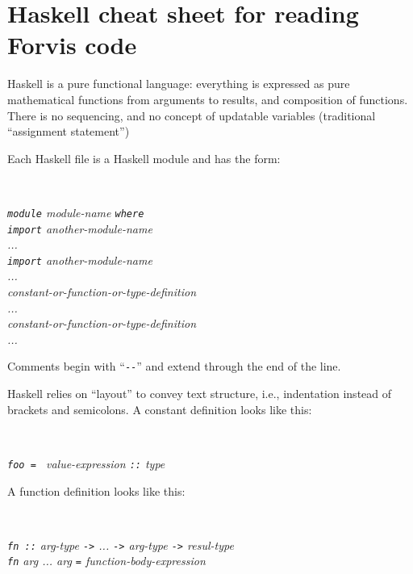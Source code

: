 \documentclass[11pt]{article}
\newcommand{\hmmmm}{\hspace*{4em}}
\begin{document}





\newpage

\appendix

\section{Haskell cheat sheet for reading Forvis code}

\label{sec_haskell_cheat_sheet}

Haskell is a pure functional language: everything is expressed as pure
mathematical functions from arguments to results, and composition of
functions.  There is no sequencing, and no concept of updatable
variables (traditional ``assignment statement'')

Each Haskell file is a Haskell module and has the form:

\hmmmm \
\begin{minipage}[t]{4in}\it
{\tt module} module-name {\tt where} \\
{\tt import} another-module-name \\
... \\
{\tt import} another-module-name \\
... \\
constant-or-function-or-type-definition \\
... \\
constant-or-function-or-type-definition \\
...
\end{minipage}

Comments begin with ``\verb|--|'' and extend through the end of the line.

Haskell relies on ``layout'' to convey text structure, i.e.,
indentation instead of brackets and semicolons. A constant definition
looks like this:

\hmmmm \
\begin{minipage}[t]{4in}\it
{\tt foo = } value-expression {\tt ::} type
\end{minipage}

A function definition looks like this:

\hmmmm \
\begin{minipage}[t]{4in}\it
{\tt fn ::} arg-type {\tt ->} ... {\tt ->} arg-type {\tt ->} resul-type \\
{\tt fn} arg ... arg {\tt  =} function-body-expression
\end{minipage}
\end{document}
